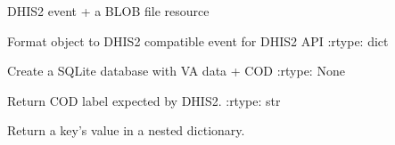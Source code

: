 \documentclass[letterpaper,12pt,english]{sphinxmanual}
\begin{document}

\begin{fulllineitems}
\label{\detokenize{help:dhis.VerbalAutopsyEvent}}
DHIS2 event + a BLOB file resource

\begin{fulllineitems}
\label{\detokenize{help:dhis.VerbalAutopsyEvent.format_to_dhis2}}
Format object to DHIS2 compatible event for DHIS2 API
:rtype: dict

\end{fulllineitems}


\end{fulllineitems}


\begin{fulllineitems}
\label{\detokenize{help:dhis.create_db}}
Create a SQLite database with VA data + COD
:rtype: None

\end{fulllineitems}


\begin{fulllineitems}
\label{\detokenize{help:dhis.getCODCode}}
Return COD label expected by DHIS2.
:rtype: str

\end{fulllineitems}


\begin{fulllineitems}
\label{\detokenize{help:dhis.findKeyValue}}
Return a key’s value in a nested dictionary.

\end{fulllineitems}
\end{document}
